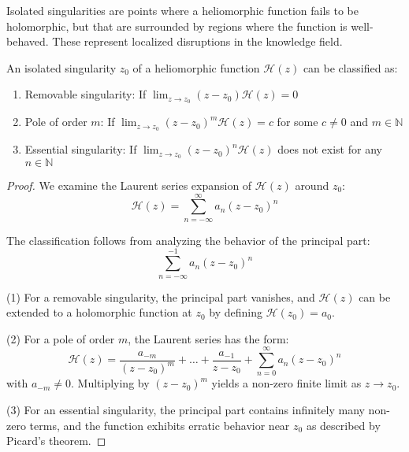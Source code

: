 Isolated singularities are points where a heliomorphic function fails to be holomorphic, but that are surrounded by regions where the function is well-behaved. These represent localized disruptions in the knowledge field.

\begin{theorem}
An isolated singularity $z_0$ of a heliomorphic function $\mathcal{H}(z)$ can be classified as:
\begin{enumerate}
    \item Removable singularity: If $\lim_{z \to z_0} (z-z_0)\mathcal{H}(z) = 0$
    \item Pole of order $m$: If $\lim_{z \to z_0} (z-z_0)^m\mathcal{H}(z) = c$ for some $c \neq 0$ and $m \in \mathbb{N}$
    \item Essential singularity: If $\lim_{z \to z_0} (z-z_0)^n\mathcal{H}(z)$ does not exist for any $n \in \mathbb{N}$
\end{enumerate}
\end{theorem}

\begin{proof}
We examine the Laurent series expansion of $\mathcal{H}(z)$ around $z_0$:
\begin{equation}
\mathcal{H}(z) = \sum_{n=-\infty}^{\infty} a_n (z-z_0)^n
\end{equation}

The classification follows from analyzing the behavior of the principal part:
\begin{equation}
\sum_{n=-\infty}^{-1} a_n (z-z_0)^n
\end{equation}

(1) For a removable singularity, the principal part vanishes, and $\mathcal{H}(z)$ can be extended to a holomorphic function at $z_0$ by defining $\mathcal{H}(z_0) = a_0$.

(2) For a pole of order $m$, the Laurent series has the form:
\begin{equation}
\mathcal{H}(z) = \frac{a_{-m}}{(z-z_0)^m} + \ldots + \frac{a_{-1}}{z-z_0} + \sum_{n=0}^{\infty} a_n (z-z_0)^n
\end{equation}
with $a_{-m} \neq 0$. Multiplying by $(z-z_0)^m$ yields a non-zero finite limit as $z \to z_0$.

(3) For an essential singularity, the principal part contains infinitely many non-zero terms, and the function exhibits erratic behavior near $z_0$ as described by Picard's theorem.
\end{proof}

